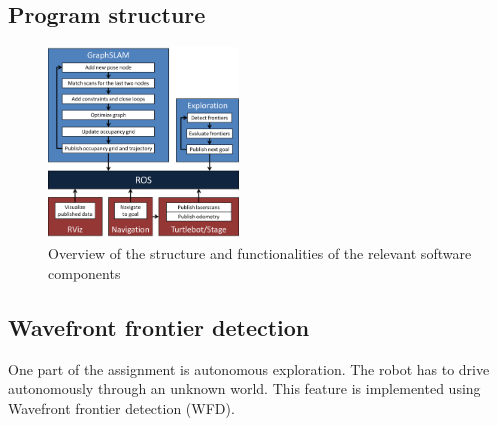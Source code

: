 \documentclass{ba-kecs}
\begin{document}
\subsection{Program structure}
\begin{figure}[htbp]
	\centering
		\includegraphics[width=0.45\textwidth]{figures/Program_structure.png}
	\caption{Overview of the structure and functionalities of the relevant software components}
	\label{fig:program_structure}
\end{figure}

\subsection{Wavefront frontier detection}
\label{sec:wfd}
One part of the assignment is autonomous exploration. The robot has to drive autonomously through an unknown world. This feature is implemented using Wavefront frontier detection (WFD).
\end{document}
